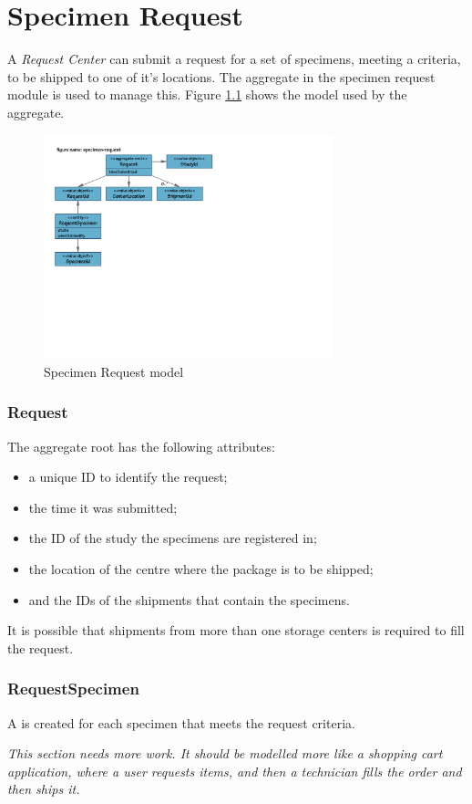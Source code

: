 \chapter{Specimen Request}
\label{chap:specimen-request}

A \emph{Request Center} can submit a request for a set of specimens, meeting a
criteria, to be shipped to one of it's locations.  The 
aggregate in the specimen request module is used to manage this. Figure
\ref{fig:specimen-request} shows the model used by the aggregate.

\begin{figure}[H]
  \centering
  \includegraphics[trim={10mm 88mm 117mm 18mm}, clip,
    width=0.75\textwidth]{images/specimen-request}
  \caption{Specimen Request model}
  \label{fig:specimen-request}
\end{figure}

\subsection*{Request}
The  aggregate root has the following attributes:
\begin{itemize}
\item a unique ID to identify the request;
\item the time it was submitted;
\item the ID of the study the specimens are registered in;
\item the location of the centre where the package is to be shipped;
\item and the IDs of the shipments that contain the specimens.
\end{itemize}

It is possible that shipments from more than one storage centers is required to
fill the request.

\subsection*{RequestSpecimen}
A  is created for each specimen that meets the
request criteria.

\vspace{10mm}

\emph{This section needs more work. It should be modelled more like a shopping
  cart application, where a user requests items, and then a technician fills the
  order and then ships it.}

